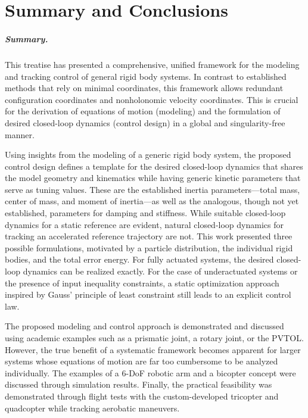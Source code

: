 \chapter{Summary and Conclusions}

\paragraph{Summary.}
This treatise has presented a comprehensive, unified framework for the modeling and tracking control of general rigid body systems.
In contrast to established methods that rely on minimal coordinates, this framework allows redundant configuration coordinates and nonholonomic velocity coordinates.
This is crucial for the derivation of equations of motion (modeling) and the formulation of desired closed-loop dynamics (control design) in a global and singularity-free manner.

Using insights from the modeling of a generic rigid body system, the proposed control design defines a template for the desired closed-loop dynamics that shares the model geometry and kinematics while having generic kinetic parameters that serve as tuning values.
These are the established inertia parameters---total mass, center of mass, and moment of inertia---as well as the analogous, though not yet established, parameters for damping and stiffness.
While suitable closed-loop dynamics for a static reference are evident, natural closed-loop dynamics for tracking an accelerated reference trajectory are not.
This work presented three possible formulations, motivated by a particle distribution, the individual rigid bodies, and the total error energy.
For fully actuated systems, the desired closed-loop dynamics can be realized exactly.
For the case of underactuated systems or the presence of input inequality constraints, a static optimization approach inspired by Gauss' principle of least constraint still leads to an explicit control law.

The proposed modeling and control approach is demonstrated and discussed using academic examples such as a prismatic joint, a rotary joint, or the PVTOL.
However, the true benefit of a systematic framework becomes apparent for larger systems whose equations of motion are far too cumbersome to be analyzed individually.
The examples of a 6-DoF robotic arm and a bicopter concept were discussed through simulation results.
Finally, the practical feasibility was demonstrated through flight tests with the custom-developed tricopter and quadcopter while tracking aerobatic maneuvers.

